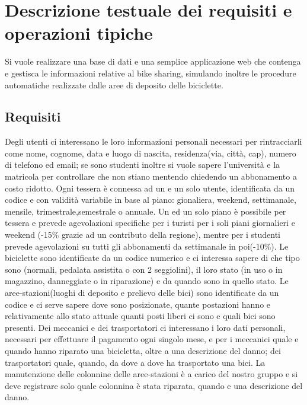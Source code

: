 \documentclass[a4paper,twoside]{article}
\begin{document}
\section{Descrizione testuale dei requisiti e operazioni tipiche}
Si vuole realizzare una base di dati e una semplice applicazione web che contenga e gestisca le informazioni relative al
bike sharing, simulando inoltre le procedure automatiche realizzate dalle aree di deposito delle biciclette.

\subsection{Requisiti}
Degli utenti ci interessano le loro informazioni personali necessari per rintracciarli come nome, cognome, data e luogo di nascita, residenza(via, città, cap), numero di telefono ed email; se sono studenti inoltre si vuole sapere l'università e la matricola per controllare che non stiano mentendo chiedendo un abbonamento a costo ridotto.\newline
Ogni tessera è connessa ad un e un solo utente, identificata da un codice e con validità variabile in base al piano: gionaliera, weekend, settimanale, mensile, trimestrale,semestrale o annuale. Un ed un solo piano è possibile per tessera e prevede agevolazioni specifiche per i turisti per i soli piani giornalieri e weekend (-15\% grazie ad un contributo della regione), mentre per i studenti prevede agevolazioni su tutti gli abbonamenti da settimanale in poi(-10\%).\newline
Le biciclette sono identificate da un codice numerico e ci interessa sapere di che tipo sono (normali, pedalata assistita o con 2 seggiolini), il loro stato (in uso o in magazzino, danneggiate o in riparazione) e da quando sono in quello stato.\newline
Le aree-stazioni(luoghi di deposito e prelievo delle bici) sono identificate da un codice e ci serve sapere dove sono posizionate, quante postazioni hanno e relativamente allo stato attuale quanti posti liberi ci sono e quali bici sono presenti.\newline
Dei meccanici e dei trasportatori ci interessano i loro dati personali, necessari per effettuare il pagamento ogni singolo mese, e per i meccanici quale e quando hanno riparato una bicicletta, oltre a una descrizione del danno; dei trasportatori quale, quando, da dove a dove ha trasportato una bici.\newline
La manutenzione delle colonnine delle aree-stazioni è a carico del nostro gruppo e si deve registrare solo quale colonnina è stata riparata, quando e una descrizione del danno.
\end{document}
